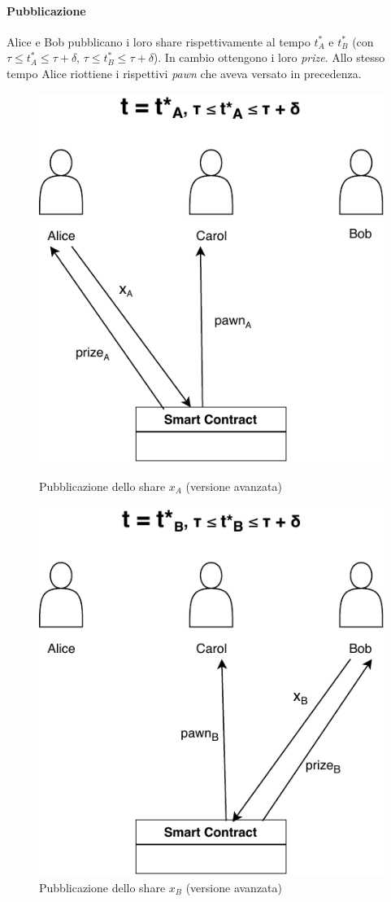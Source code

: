 \paragraph{Pubblicazione}
Alice e Bob pubblicano i loro share rispettivamente al tempo $ t^*_A $ e $ t^*_B $
(con $ \tau \leq t^*_A \leq \tau + \delta $, $ \tau \leq t^*_B \leq \tau + \delta $).
In cambio ottengono i loro
\textit{prize}.
Allo stesso tempo Alice riottiene i rispettivi \textit{pawn} che aveva versato
in precedenza.
\begin{figure}[H]
	\begin{minipage}{0.45\textwidth}
		\centering
		\includegraphics[width=.7\linewidth]{images/chap_protocollo/avanzato-pubblicazione-a.pdf}
		\caption{Pubblicazione dello share $ x_A $ (versione avanzata)}
	\end{minipage}\hfill
	\begin{minipage}{0.45\textwidth}
		\centering
		\includegraphics[width=.7\linewidth]{images/chap_protocollo/avanzato-pubblicazione-b.pdf}
		\caption{Pubblicazione dello share $ x_B $ (versione avanzata)}
	\end{minipage}
\end{figure}

